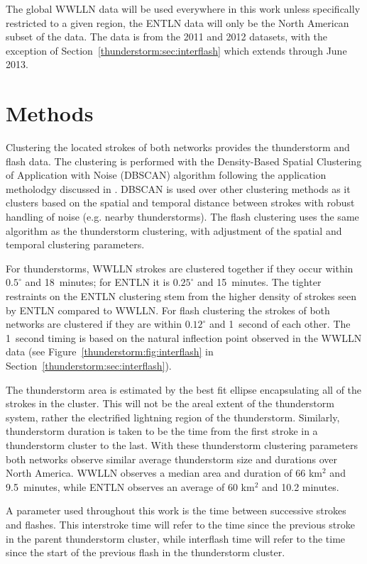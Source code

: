 The global WWLLN data will be used everywhere in this work unless specifically restricted to a given region, the ENTLN data will only be the North American subset of the data.
The data is from the 2011 and 2012 datasets, with the exception of Section~\ref{thunderstorm:sec:interflash} which extends through June 2013.

\section{Methods}

Clustering the located strokes of both networks provides the thunderstorm and flash data.
The clustering is performed with the Density-Based Spatial Clustering of Application with Noise (DBSCAN) algorithm \citep{Ester1996, Kriegel2011a} following the application metholodgy discussed in \citet{Hutchins2014}.
DBSCAN is used over other clustering methods as it clusters based on the spatial and temporal distance between strokes with robust handling of noise (e.g. nearby thunderstorms).
The flash clustering uses the same algorithm as the thunderstorm clustering, with adjustment of the spatial and temporal clustering parameters.

For thunderstorms, WWLLN strokes are clustered together if they occur within $0.5^\circ$ and 18~minutes; for ENTLN it is $0.25^\circ$ and 15~minutes.
The tighter restraints on the ENTLN clustering stem from the higher density of strokes seen by ENTLN compared to WWLLN.
For flash clustering the strokes of both networks are clustered if they are within $0.12^\circ$ and 1~second of each other.
The 1~second timing is based on the natural inflection point observed in the WWLLN data (see Figure~\ref{thunderstorm:fig:interflash} in Section~\ref{thunderstorm:sec:interflash}).

The thunderstorm area is estimated by the best fit ellipse encapsulating all of the strokes in the cluster.
This will not be the areal extent of the thunderstorm system, rather the electrified lightning region of the thunderstorm.
Similarly, thunderstorm duration is taken to be the time from the first stroke in a thunderstorm cluster to the last.
With these thunderstorm clustering parameters both networks observe similar average thunderstorm size and durations over North America.
WWLLN observes a median area and duration of 66 km$^2$ and 9.5~minutes, while ENTLN observes an average of 60 km$^2$ and 10.2 minutes.

A parameter used throughout this work is the time between successive strokes and flashes.
This interstroke time will refer to the time since the previous stroke in the parent thunderstorm cluster, while interflash time will refer to the time since the start of the previous flash in the thunderstorm cluster.

